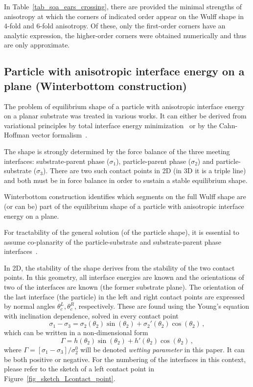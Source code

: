	In Table~\ref{tab_soa_ears_crossing}, there are provided the minimal strengths of anisotropy at which the corners of indicated order appear on the Wulff shape in 4-fold and 6-fold anisotropy. Of these, only the first-order corners have an analytic expression, the higher-order corners were obtained numerically and thus are only approximate.
	
	\subsection{Particle with anisotropic interface energy on a plane (Winterbottom construction)}
	The problem of equilibrium shape of a particle with anisotropic interface energy on a planar substrate was treated in various works. It can either be derived from variational principles by total interface energy minimization~\cite{Winterbottom1967, Mariaux2011} or by the Cahn-Hoffman vector formalism~\cite{Cahn1974}. 
	
	The shape is strongly determined by the force balance of the three meeting interfaces: substrate-parent phase ($\sigma_1$), particle-parent phase ($\sigma_2$) and particle-substrate ($\sigma_3$). There are two such contact points in 2D (in 3D it is a triple line) and both must be in force balance in order to sustain a stable equilibrium shape. 
	
	Winterbottom construction identifies which segments on the full Wulff shape are (or can be) part of the equilibrium shape of a particle with anisotropic interface energy on a plane. 
	
	For tractability of the general solution (of the particle shape), it is essential to assume co-planarity of the particle-substrate and substrate-parent phase interfaces~\cite{Winterbottom1967, Cahn1974, Bao2017}. 
	
	In 2D, the stability of the shape derives from the stability of the two contact points. In this geometry, all interface energies are known and the orientations of two of the interfaces are known (the former substrate plane). The orientation of the last interface (the particle) in the left and right contact points are expressed by normal angles $\theta_c^L,\theta_c^R$, respectively. These are found using the Young's equation with inclination dependence, solved in every contact point 
	\begin{equation}\label{eq_Young_anisotropic}
		\sigma_1 - \sigma_{3} = \sigma_2(\theta_2)\sin(\theta_2) + \sigma_2'(\theta_2)\cos(\theta_2) \,,
	\end{equation}
	which can be written in a non-dimensional form
	\begin{equation} \label{eq_nondim_aniso_young}
		\Gamma = h(\theta_2)\sin(\theta_2) + h'(\theta_2)\cos(\theta_2) \,,
	\end{equation}
	where $\Gamma = [\sigma_{1}-\sigma_3 ]/\sigma_2^0$ will be denoted \textit{wetting parameter} in this paper. It can be both positive or negative. For the numbering of the interfaces in this context, please refer to the sketch of a left contact point in Figure~\ref{fig_sketch_Lcontact_point}.
	
